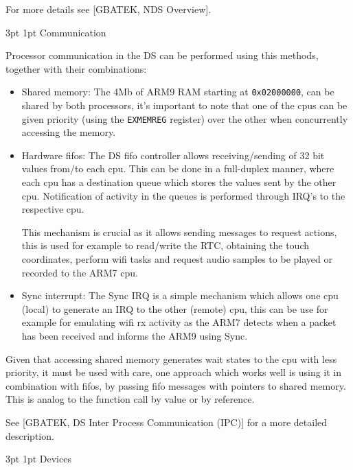 \documentclass[11pt]{p9article}
\makeatletter
\renewcommand\subsection{\@startsection {subsection}{1}{\z@} {3pt}
{1pt} {\normalfont\normalsize\bfseries}}
\makeatother
\begin{document}
For more details see \cite{gbatek}[GBATEK, NDS Overview].

\subsection{Communication}

Processor communication in the DS can be performed using this methods,
together with their combinations:
\begin{itemize}
	\item Shared memory:
	The 4Mb of ARM9 RAM starting at \texttt{0x02000000}, can be shared by both processors,
	it's important to note that one of the cpus can be given priority (using the \texttt{EXMEMREG} register)
	over the other when concurrently accessing the memory.
	
	\item Hardware fifos:
	The DS fifo controller allows receiving/sending of 32 bit values from/to each cpu.
	This can be done in a full-duplex manner, where each cpu has a destination queue
	which stores the values sent by the other cpu. Notification of activity in the queues
	is performed through IRQ's to the respective cpu.

	This mechanism is crucial as it allows sending messages to request actions,
	this is used for example to read/write the RTC, obtaining the touch coordinates,
	perform wifi tasks and request audio samples to be played or recorded to the ARM7 cpu.
	
	\item Sync interrupt:
	The Sync IRQ is a simple mechanism which allows one cpu (local) to generate an IRQ
	to the other (remote) cpu, this can be use for example for emulating wifi rx activity
	as the ARM7 detects when a packet has been received and informs the ARM9 using Sync.
	
\end{itemize}

Given that accessing shared memory generates wait states to the cpu with less priority,
it must be used with care, one approach which works well is using it in combination
with fifos, by passing fifo messages with pointers to shared memory.
This is analog to the function call by value or by reference.

See \cite{gbatek}[GBATEK, DS Inter Process Communication (IPC)] for a more detailed description.

\subsection{Devices}
\end{document}
